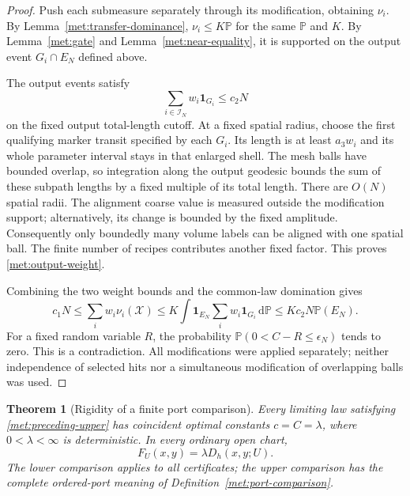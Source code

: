 \documentclass[11pt]{article}
\numberwithin{equation}{section}
\newtheorem{theorem}{Theorem}[section]
\theoremstyle{definition}
\theoremstyle{remark}
\newcommand{\1}{\mathbf 1}
\begin{document}
\begin{proof}
Push each submeasure separately through its modification, obtaining
$\nu_i$.  By Lemma~\ref{met:transfer-dominance}, $\nu_i\leq K\mathbb P$
for the same $\mathbb P$ and $K$.  By Lemma~\ref{met:gate} and
Lemma~\ref{met:near-equality}, it is supported on the output event
$G_i\cap E_N$ defined above.

The output events satisfy
\begin{equation}
 \sum_{i\in\mathcal I_N}w_i\mathbf 1_{G_i}
 \leq c_2N
 \label{met:output-weight}
\end{equation}
on the fixed output total-length cutoff.  At a fixed spatial radius,
choose the first qualifying marker transit specified by each $G_i$.
Its length is at least $a_3w_i$ and its whole parameter interval
stays in that enlarged shell.  The mesh balls have bounded overlap,
so integration along the output geodesic bounds the sum of these
subpath lengths by a fixed multiple of its total length.  There are $O(N)$ spatial radii.  The
alignment coarse value is measured outside the modification support;
alternatively, its change is bounded by the fixed amplitude.
Consequently only boundedly many volume labels can be aligned with
one spatial ball.  The finite number of recipes contributes another
fixed factor.  This proves \eqref{met:output-weight}.

Combining the two weight bounds and the common-law domination gives
\[
 c_1N
 \leq\sum_iw_i\nu_i(\mathcal X)
 \leq K\int\mathbf 1_{E_N}\sum_iw_i\mathbf 1_{G_i}\,\mathrm d\mathbb P
 \leq Kc_2N\mathbb P(E_N).
\]
For a fixed random variable $R$, the probability
$\mathbb P(0<C-R\leq\epsilon_N)$ tends to zero.  This is a
contradiction.  All modifications were applied separately; neither
independence of selected hits nor a simultaneous modification of
overlapping balls was used.
\end{proof}

\begin{theorem}[Rigidity of a finite port comparison]
\label{met:rigidity}
Every limiting law satisfying \eqref{met:preceding-upper} has
coincident optimal constants $c=C=\lambda$, where
$0<\lambda<\infty$ is deterministic.  In every ordinary open chart,
\[
 F_U(x,y)=\lambda D_h(x,y;U).
\]
The lower comparison applies to all certificates; the upper
comparison has the complete ordered-port meaning of
Definition~\ref{met:port-comparison}.
\end{theorem}
\end{document}
